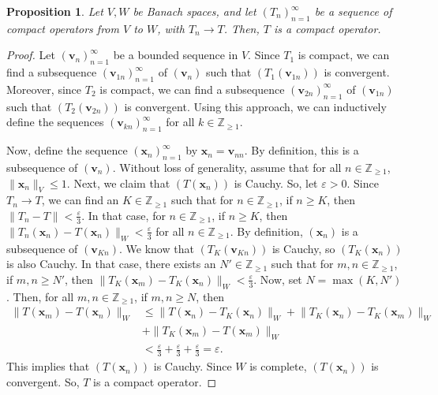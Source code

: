 \documentclass[a4paper, openany]{memoir}
\theoremstyle{definition}
\theoremstyle{plain}
\newtheorem{proposition}[definition]{Proposition}
\begin{document}
    \begin{proposition}
        Let $V, W$ be Banach spaces, and let $(T_n)_{n=1}^\infty$ be a sequence of compact operators from $V$ to $W$, with $T_n \to T$. Then, $T$ is a compact operator.
    \end{proposition}
    \begin{proof}
        Let $(\bm{v}_n)_{n=1}^\infty$ be a bounded sequence in $V$. Since $T_1$ is compact, we can find a subsequence $(\bm{v}_{1n})_{n=1}^\infty$ of $(\bm{v}_n)$ such that $(T_1(\bm{v}_{1n}))$ is convergent. Moreover, since $T_2$ is compact, we can find a subsequence $(\bm{v}_{2n})_{n=1}^\infty$ of $(\bm{v}_{1n})$ such that $(T_2(\bm{v}_{2n}))$ is convergent. Using this approach, we can inductively define the sequences $(\bm{v}_{kn})_{n=1}^\infty$ for all $k \in \mathbb{Z}_{\geq 1}$. 
        
        \noindent Now, define the sequence $(\bm{x}_n)_{n=1}^\infty$ by $\bm{x}_n = \bm{v}_{nn}$. By definition, this is a subsequence of $(\bm{v}_n)$. Without loss of generality, assume that for all $n \in \mathbb{Z}_{\geq 1}$, $\lVert \bm{x}_n \rVert_V \leq 1$. Next, we claim that $(T(\bm{x}_n))$ is Cauchy. So, let $\varepsilon > 0$. Since $T_n \to T$, we can find an $K \in \mathbb{Z}_{\geq 1}$ such that for $n \in \mathbb{Z}_{\geq 1}$, if $n \geq K$, then $\lVert T_n - T \rVert < \frac{\varepsilon}{3}$. In that case, for $n \in \mathbb{Z}_{\geq 1}$, if $n \geq K$, then $\lVert T_n(\bm{x}_n) - T(\bm{x}_n) \rVert_W < \frac{\varepsilon}{3}$ for all $n \in \mathbb{Z}_{\geq 1}$. By definition, $(\bm{x}_n)$ is a subsequence of $(\bm{v}_{Kn})$. We know that $(T_K(\bm{v}_{Kn}))$ is Cauchy, so $(T_K (\bm{x}_n))$ is also Cauchy. In that case, there exists an $N' \in \mathbb{Z}_{\geq 1}$ such that for $m, n \in \mathbb{Z}_{\geq 1}$, if $m, n \geq N'$, then $\lVert T_K (\bm{x}_m) - T_K (\bm{x}_n) \rVert_W < \frac{\varepsilon}{3}$. Now, set $N = \max(K, N')$. Then, for all $m, n \in \mathbb{Z}_{\geq 1}$, if $m, n \geq N$, then
        \begin{align*}
            \lVert T(\bm{x}_m) - T(\bm{x}_n) \rVert_W &\leq \lVert T(\bm{x}_n) - T_K(\bm{x}_n)\rVert_W + \lVert T_K(\bm{x}_n) - T_K(\bm{x}_m) \rVert_W \\
            &+ \lVert T_K(\bm{x}_m) - T(\bm{x}_m) \rVert_W \\
            &< \frac{\varepsilon}{3} + \frac{\varepsilon}{3} + \frac{\varepsilon}{3} = \varepsilon.
        \end{align*}
        This implies that $(T(\bm{x}_n))$ is Cauchy. Since $W$ is complete, $(T(\bm{x}_n))$ is convergent. So, $T$ is a compact operator.
    \end{proof}
\end{document}
